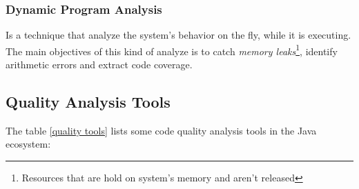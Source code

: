 \subsubsection{Dynamic Program Analysis}
Is a technique that analyze the system's behavior on the fly, while it is executing. The main objectives of this kind of analyze is to catch \textit{memory leaks}\footnote{Resources that are hold on system's memory and aren't released}, identify arithmetic errors and extract code coverage. 


\subsection{Quality Analysis Tools}
\label{ch2:qatools}
The table \ref{quality tools} lists some code quality analysis tools in the Java ecosystem:


